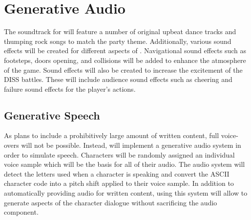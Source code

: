 \section{Generative Audio}
The soundtrack for \ourgame{} will feature a number of original upbeat dance tracks and thumping rock songs to match the party theme. Additionally, various sound effects will be created for different aspects of \ourgame{}. Navigational sound effects such as footsteps, doors opening, and collisions will be added to enhance the atmosphere of the game. Sound effects will also be created to increase the excitement of the DISS battles. These will include audience sound effects such as cheering and failure sound effects for the player's actions. 

\subsection{Generative Speech}
As \ourteam{} plans to include a prohibitively large amount of written content, full voice-overs will not be possible. Instead, \ourgame{} will implement a generative audio system in order to simulate speech. Characters will be randomly assigned an individual voice sample which will be the basis for all of their audio. The audio system will detect the letters used when a character is speaking and convert the ASCII character code into a pitch shift applied to their voice sample. In addition to automatically providing audio for written content, using this system will allow \ourteam{} to generate aspects of the character dialogue without sacrificing the audio component.